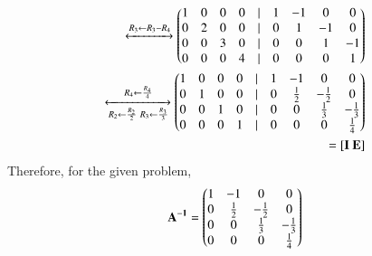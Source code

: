 \documentclass[journal,12pt,twocolumn]{IEEEtran}
\begin{document}
\begin{align}
			\xleftrightarrow[]{R_3 \leftarrow R_3 - R_4}
                        \begin{pmatrix} 1 & 0 & 0 & 0 &| & 1 & -1 & 0 & 0 \\
                                0 & 2 & 0 & 0 &| & 0 & 1 & -1 & 0 \\
                                0 & 0 & 3 & 0 &| & 0 & 0 & 1 & -1 \\
                                0 & 0 & 0 & 4 &| & 0 & 0 & 0 & 1 \end{pmatrix}\\
\xleftrightarrow[R_2 \leftarrow \frac{R_2}{2} \ R_3 \leftarrow \frac{R_3}{3}]
		{R_4 \leftarrow \frac{R_4}{4}}
                \begin{pmatrix} 1 & 0 & 0 & 0 &| & 1 & -1 & 0 & 0 \\
			0 & 1 & 0 & 0 &| & 0 & \frac{1}{2} & -\frac{1}{2} & 0 \\
			0 & 0 & 1 & 0 &| & 0 & 0 & \frac{1}{3} & -\frac{1}{3} \\
			0 & 0 & 0 & 1 &| & 0 & 0 & 0 & \frac{1}{4}\end{pmatrix}\nonumber \\ 
			= \mathbf{[I \ E]}
\end{align}
Therefore, for the given problem,
\begin{align}
        \mathbf{A^{-1}} = \begin{pmatrix} 1 & -1 & 0 & 0 \\
                        0 & \frac{1}{2} & -\frac{1}{2} & 0 \\
                        0 & 0 & \frac{1}{3} & -\frac{1}{3} \\
                        0 & 0 & 0 & \frac{1}{4}\end{pmatrix}
\end{align}
\end{document}
